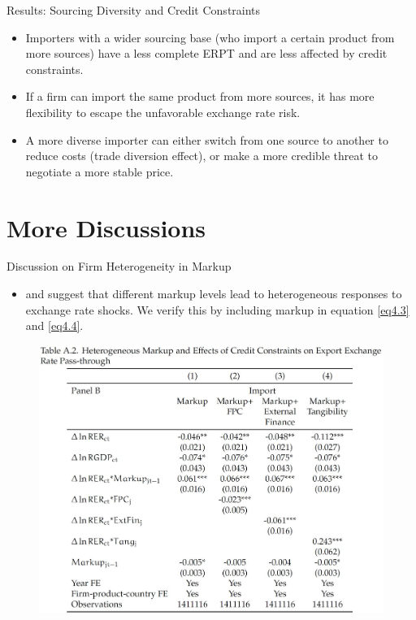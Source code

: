 \documentclass[10pt]{beamer}
\begin{document}
\begin{frame}{Results: Sourcing Diversity and Credit Constraints}
	\begin{tcolorbox}[colback=blue!5!white, colframe=blue!75!black,title=Key Finding 3]
		\begin{itemize}
			\item Importers with a wider sourcing base (who import a certain product from more sources) have a less complete ERPT and are less affected by credit constraints.
		\end{itemize}
	\end{tcolorbox}
	\begin{itemize}
		\item If a firm can import the same product from more sources, it has more flexibility to escape the unfavorable exchange rate risk.
		\item A more diverse importer can either switch from one source to another to reduce costs (trade diversion effect), or make a more credible threat to negotiate a more stable price.
	\end{itemize}
\end{frame}

\section{More Discussions}

\begin{frame}{Discussion on Firm Heterogeneity in Markup}
	\begin{itemize}
		\item \cite{bmm2012} and \cite{lmx2015} suggest that different markup levels lead to
		heterogeneous responses to exchange rate shocks. We verify this by including markup in equation \ref{eq4.3} and \ref{eq4.4}.
	\end{itemize}
	\begin{figure}[htbp]
		\centering
		\includegraphics[width=0.75\columnwidth]{TableA2.jpg}
		\label{tabA2}
	\end{figure}
\end{frame}
\end{document}

